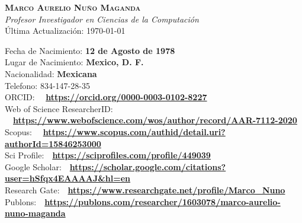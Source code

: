 \documentclass[letterpaper,10pt]{article}
\begin{document}
\begin{center}
    \textbf{\Large \scshape Marco Aurelio Nuño Maganda} \\ \vspace{1pt}
    \textit{Profesor Investigador en Ciencias de la Computación} \\
    Última Actualización: \today \\
\end{center}

\begin{minipage}{0.98 \textwidth} %
Fecha de Nacimiento: \textbf{12 de Agosto de 1978} \\
Lugar de Nacimiento: \textbf{Mexico, D. F.}\\
Nacionalidad: \textbf{Mexicana}\\
Telefono: 834-147-28-35  \\
ORCID: \ \ \textbf{\url{https://orcid.org/0000-0003-0102-8227}} \\
Web of Science ResearcherID: \ \ \textbf{\url{https://www.webofscience.com/wos/author/record/AAR-7112-2020}} \\
Scopus: \ \ \textbf{\url{https://www.scopus.com/authid/detail.uri?authorId=15846253000}} \\
Sci Profile:\ \ \textbf{\url{https://sciprofiles.com/profile/449039}} \\
Google Scholar:\ \ \textbf{\url{https://scholar.google.com/citations?user=hSfqx4EAAAAJ&hl=en}}\\
Research Gate:\ \ \textbf{\url{https://www.researchgate.net/profile/Marco_Nuno}}\\
Publons:\ \  \textbf{\url{https://publons.com/researcher/1603078/marco-aurelio-nuno-maganda}}\\
\end{minipage}
\end{document}
